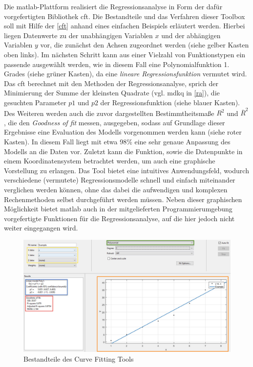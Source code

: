Die \gls{matlab}-Plattform realisiert die Regressionsanalyse in Form der dafür vorgefertigten Bibliothek \gls{cft}. Die Bestandteile und das Verfahren dieser Toolbox soll mit Hilfe der \vref{cft} anhand eines einfachen Beispiels erläutert werden. Hierbei liegen Datenwerte zu der unabhängigen Variablen $x$ und der abhängigen Variablen $y$ vor, die zunächst den Achsen zugeordnet werden (siehe gelber Kasten oben links). Im nächsten Schritt kann aus einer Vielzahl von Funktionstypen ein passende ausgewählt werden, wie in diesem Fall eine Polynomialfunktion 1. Grades (siehe grüner Kasten), da eine \textit{lineare Regressionsfunktion} vermutet wird. Das \gls{cft} berechnet mit den Methoden der Regressionsanalyse, sprich der Minimierung der Summe der kleinsten Quadrate (vgl. \gls{mdkq} in \vref{ra}), die gesuchten Parameter $p1$ und $p2$ der Regressionsfunktion (siehe blauer Kasten). Des Weiteren werden auch die zuvor dargestellten Bestimmtheitsmaße $R^2$ und $\overline{R}^2$, die den \textit{Goodness of fit} messen, ausgegeben, sodass auf Grundlage dieser Ergebnisse eine Evaluation des Modells vorgenommen werden kann (siehe roter Kasten). In diesem Fall liegt mit etwa 98\% eine sehr genaue Anpassung des Modells an die Daten vor. Zuletzt kann die Funktion, sowie die Datenpunkte in einem Koordinatensystem betrachtet werden, um auch eine graphische Vorstellung zu erlangen. Das Tool bietet eine intuitives Anwendungsfeld, wodurch verschiedene (vermutete) Regressionsmodelle schnell und einfach miteinander verglichen werden können, ohne das dabei die aufwendigen und komplexen Rechenmethoden selbst durchgeführt werden müssen. Neben dieser graphischen Möglichkeit bietet \gls{matlab} auch in der mitgelieferten Programmierumgebung vorgefertigte Funktionen für die Regressionsanalyse, auf die hier jedoch nicht weiter eingegangen wird.

\begin{figure}
\centering
\includegraphics[scale=0.675]{se-wa-jpg/cft}
\caption[Bestandteile des Curve Fitting Tools]{Bestandteile des Curve Fitting Tools\protect\footnotemark}
\label{cft}
\end{figure}
